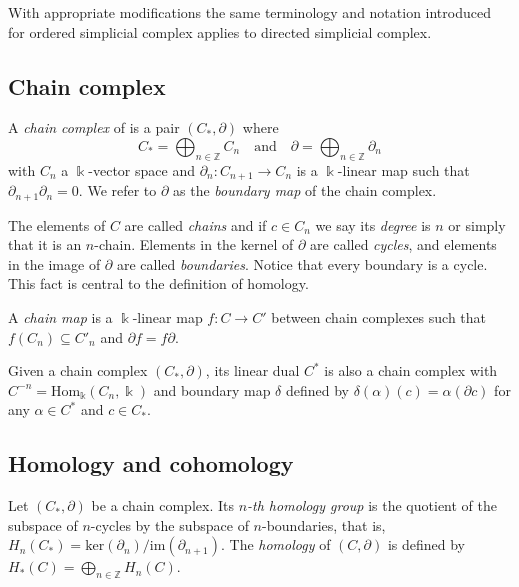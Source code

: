 \documentclass{amsart}
\begin{document}
	With appropriate modifications the same terminology and notation introduced for
	ordered simplicial complex applies to directed simplicial complex.
	
	\subsection*{Chain complex} \label{chain_complex}
	
	A \textit{chain complex} of is a pair $(C_*, \partial)$ where
	\begin{equation*}
	C_* = \bigoplus_{n \in \mathbb Z} C_n \quad \mathrm{and} \quad \partial = \bigoplus_{n \in \mathbb Z} \partial_n
	\end{equation*}
	with $C_n$ a $\Bbbk$-vector space and $\partial_n : C_{n+1} \to C_n$ is a $\Bbbk$-linear map such that $\partial_{n+1} \partial_n = 0$. We refer to $\partial$ as the \textit{boundary map} of the chain complex.
	
	The elements of $C$ are called \textit{chains} and if $c \in C_n$ we say its \textit{degree} is $n$ or simply that it is an $n$-chain. Elements in the kernel of $\partial$ are called \textit{cycles}, and elements in the image of $\partial$ are called \textit{boundaries}. Notice that every boundary is a cycle. This fact is central to the definition of 
	homology.
	
	A \textit{chain map} is a $\Bbbk$-linear map $f : C \to C'$ between chain complexes such that $f(C_n) \subseteq C'_n$ and $\partial f = f \partial$.
	
	Given a chain complex $(C_*, \partial)$, its linear dual $C^*$ is also a chain complex with $C^{-n} = \mathrm{Hom_\Bbbk}(C_n, \Bbbk)$ and boundary map $\delta$ defined by $\delta(\alpha)(c) = \alpha(\partial c)$ for any $\alpha \in C^*$ and $c \in C_*$.
	
	\subsection*{Homology and cohomology} \label{homology_and_cohomology}
	
	Let $(C_*, \partial)$ be a 
	chain complex. Its $n$\textit{-th homology group} is the quotient of the subspace of $n$-cycles by the subspace of $n$-boundaries, that is, $H_n(C_*) = \mathrm{ker}(\partial_n)/ \mathrm{im}(\partial_{n+1})$. The \textit{homology} of $(C, \partial)$ is defined by $H_*(C) = \bigoplus_{n \in \mathbb Z} H_n(C)$.
	
\end{document}
